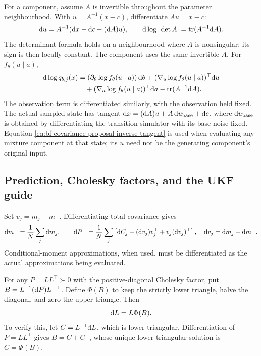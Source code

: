 For a component, assume \(A\) is invertible throughout the
parameter neighbourhood. With \(u=A^{-1}(x-c)\), differentiate \(Au=x-c\):
\begin{equation}
\label{eq:bf-covariance-proposal-inverse-tangent}
 \mathrm d u=A^{-1}(\mathrm d x-\mathrm d c-(\mathrm d A)u),\qquad
 \mathrm d\log|\det A|=\operatorname{tr}(A^{-1}\mathrm d A).
\end{equation}
The determinant formula holds on a neighbourhood where \(A\) is
nonsingular; its sign is then locally constant. The component uses the same invertible \(A\).
For \(f_\theta(u\mid a)\),
\begin{equation}
\label{eq:bf-covariance-proposal-component-tangent}
 \begin{aligned}
 \mathrm d\log q_{b,j}(x)
 &=(\partial_\theta\log f_\theta(u\mid a))\,\mathrm d\theta
  +(\nabla_u\log f_\theta(u\mid a))^\top\mathrm d u\\
 &\quad +(\nabla_a\log f_\theta(u\mid a))^\top\mathrm d a
  -\operatorname{tr}(A^{-1}\mathrm d A).
 \end{aligned}
\end{equation}
The observation term is differentiated similarly, with the observation
held fixed. The actual sampled state has tangent
\(\mathrm d x=(\mathrm d A)u+A\,\mathrm d u_{\rm base}+\mathrm d c\), where
\(\mathrm d u_{\rm base}\) is obtained by differentiating the transition simulator
with its base noise fixed. Equation \eqref{eq:bf-covariance-proposal-inverse-tangent} is used
when evaluating any mixture component at that state; its \(u\) need not
be the generating component's original input.

\subsection{Prediction, Cholesky factors, and the UKF guide}

Set \(v_j=m_j-m^-\). Differentiating total covariance gives
\begin{equation}
\label{eq:bf-covariance-proposal-prediction-tangent}
 \mathrm d m^-=\frac1N\sum_j\mathrm d m_j,\qquad
 \mathrm d P^-=\frac1N\sum_j\left[
 \mathrm d C_j+(\mathrm d v_j)v_j^\top+v_j(\mathrm d v_j)^\top\right],
 \quad \mathrm d v_j=\mathrm d m_j-\mathrm d m^-.
\end{equation}
Conditional-moment approximations, when used, must be differentiated as
the actual approximations being evaluated.

For any \(P=LL^\top\succ0\) with the positive-diagonal Cholesky factor,
put \(B=L^{-1}(\mathrm d P)L^{-\top}\). Define \(\Phi(B)\) to keep the strictly
lower triangle, halve the diagonal, and zero the upper triangle. Then
\begin{equation}
\label{eq:bf-covariance-proposal-chol-tangent}
 \mathrm d L=L\Phi(B).
\end{equation}
To verify this, let \(C=L^{-1}\mathrm d L\), which is lower triangular.
Differentiation of \(P=LL^\top\) gives \(B=C+C^\top\), whose unique
lower-triangular solution is \(C=\Phi(B)\).

